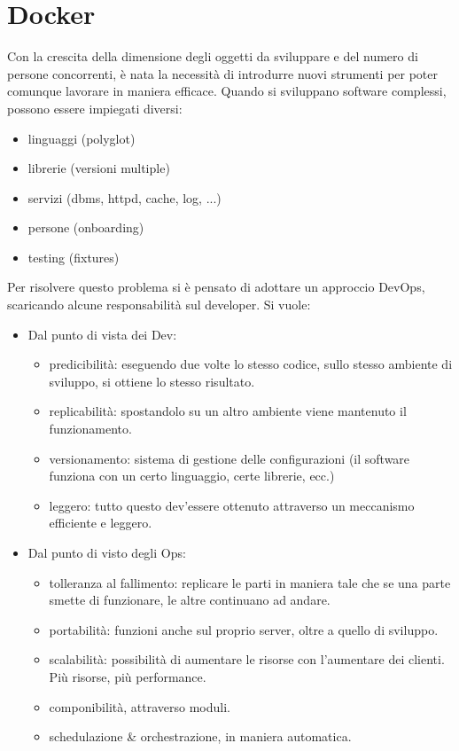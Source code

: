 \section{Docker}

Con la crescita della dimensione degli oggetti da sviluppare e del numero di persone concorrenti, è nata la necessità di introdurre nuovi strumenti per poter comunque lavorare in maniera efficace. Quando si sviluppano software complessi, possono essere impiegati diversi:

\begin{itemize}
    \item linguaggi (polyglot)
    \item librerie (versioni multiple)
    \item servizi (dbms, httpd, cache, log, ...)
    \item persone (onboarding)
    \item testing (fixtures)
\end{itemize}

\noindent Per risolvere questo problema si è pensato di adottare un approccio DevOps, scaricando alcune responsabilità sul developer. Si vuole:

\begin{itemize}
    \item Dal punto di vista dei Dev:
    \begin{itemize}
        \item predicibilità: eseguendo due volte lo stesso codice, sullo stesso ambiente di sviluppo, si ottiene lo stesso risultato.
        \item replicabilità: spostandolo su un altro ambiente viene mantenuto il funzionamento.
        \item versionamento: sistema di gestione delle configurazioni (il software funziona con un certo linguaggio, certe librerie, ecc.)
        \item leggero: tutto questo dev'essere ottenuto attraverso un meccanismo efficiente e leggero.
    \end{itemize}
    \item Dal punto di visto degli Ops:
    \begin{itemize}
        \item tolleranza al fallimento: replicare le parti in maniera tale che se una parte smette di funzionare, le altre continuano ad andare.
        \item portabilità: funzioni anche sul proprio server, oltre a quello di sviluppo.
        \item scalabilità: possibilità di aumentare le risorse con l'aumentare dei clienti. Più risorse, più performance.
        \item componibilità, attraverso moduli.
        \item schedulazione \& orchestrazione, in maniera automatica.
    \end{itemize}
\end{itemize}

